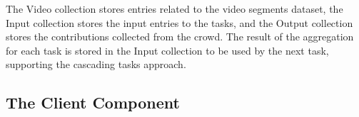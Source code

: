 


The Video collection stores entries related to the video segments dataset, the Input collection stores the input entries to the tasks, and the Output collection stores the contributions collected from the crowd. The result of the aggregation for each task is stored in the Input collection to be used by the next task, supporting the cascading tasks approach.




\subsection{The Client Component}

